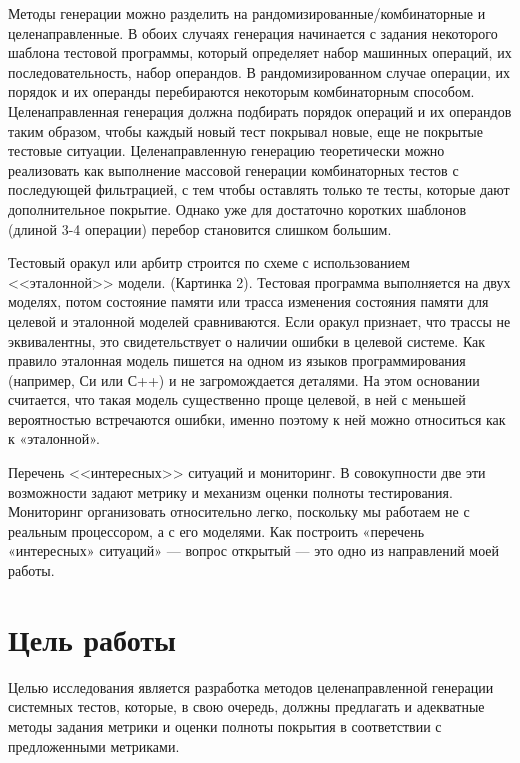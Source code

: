 \documentclass[14pt]{extreport}
\begin{document}
Методы генерации можно разделить на рандомизированные/комбинаторные и целенаправленные. В обоих случаях генерация начинается с задания некоторого шаблона тестовой программы, который определяет набор машинных операций, их последовательность, набор операндов. В рандомизированном случае операции, их порядок и их операнды перебираются некоторым комбинаторным способом. Целенаправленная генерация должна подбирать порядок операций и их операндов таким образом, чтобы каждый новый тест покрывал новые, еще не покрытые тестовые ситуации. Целенаправленную генерацию теоретически можно реализовать как выполнение массовой генерации комбинаторных тестов с последующей фильтрацией, с тем чтобы оставлять только те тесты, которые дают дополнительное покрытие. Однако  уже для достаточно коротких шаблонов (длиной 3-4 операции) перебор становится слишком большим.

Тестовый оракул или арбитр строится по схеме с использованием <<эталонной>> модели. (Картинка 2). Тестовая программа выполняется на двух моделях, потом состояние памяти или трасса изменения состояния памяти для целевой и эталонной моделей сравниваются.  Если оракул признает, что трассы не эквивалентны, это свидетельствует о наличии ошибки в целевой системе. Как правило эталонная модель пишется на одном из языков программирования (например, Си или С++) и не загромождается деталями.  На этом основании считается, что такая модель существенно проще целевой, в ней с меньшей вероятностью встречаются ошибки, именно поэтому к ней можно относиться как к «эталонной».

Перечень <<интересных>> ситуаций и мониторинг. В совокупности две эти возможности задают метрику и механизм оценки полноты тестирования. Мониторинг организовать относительно легко, поскольку мы работаем не с реальным процессором, а с его моделями. Как построить «перечень «интересных» ситуаций» --- вопрос открытый --- это одно из направлений моей работы.


\section*{Цель работы}
Целью исследования является разработка методов целенаправленной генерации системных тестов, которые, в свою очередь, должны предлагать и адекватные методы задания метрики и оценки полноты покрытия в соответствии с предложенными метриками.
\end{document}
